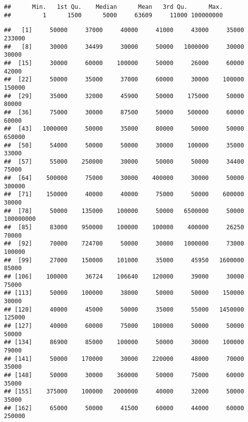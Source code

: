 \documentclass[
]{article}
\newenvironment{Shaded}{\begin{snugshade}}{\end{snugshade}}
\newcommand{\KeywordTok}[1]{\textcolor[rgb]{0.13,0.29,0.53}{\textbf{#1}}}
\newcommand{\NormalTok}[1]{#1}
\newcommand{\OperatorTok}[1]{\textcolor[rgb]{0.81,0.36,0.00}{\textbf{#1}}}
\begin{document}
\begin{verbatim}
##      Min.   1st Qu.    Median      Mean   3rd Qu.      Max. 
##         1      1500      5000     63609     11000 100000000
\end{verbatim}

\begin{Shaded}
\end{Shaded}

\begin{verbatim}
##   [1]     50000     37000     40000     41000     43000     35000    233000
##   [8]     30000     34499     30000     50000   1000000     30000     30000
##  [15]     30000     60000    100000     50000     26000     60000     42000
##  [22]     50000     35000     37000     60000     30000    100000    150000
##  [29]     35000     32000     45900     50000    175000     50000     80000
##  [36]     75000     30000     87500     50000    500000     60000     60000
##  [43]   1000000     50000     35000     80000     50000     50000    650000
##  [50]     54000     50000     50000     30000    100000     35000     33000
##  [57]     55000    250000     30000     50000     50000     34400     75000
##  [64]    500000     75000     30000    400000     30000     50000    300000
##  [71]    150000     40000     40000     75000     50000    600000     30000
##  [78]     50000    135000    100000     50000   6500000     50000 100000000
##  [85]     83000    950000    100000    100000    400000     26250     70000
##  [92]     70000    724700     50000     30000   1000000     73000    100000
##  [99]     27000    150000    101000     35000     45950   1600000     85000
## [106]    100000     36724    106640    120000     39000     30000     75000
## [113]     50000    100000     38000     50000     50000    150000     30000
## [120]     40000     45000     50000     35000     55000   1450000    125000
## [127]     40000     60000     75000    100000     50000     50000     50000
## [134]     86900     85000    100000     50000     30000    100000     79000
## [141]     50000    170000     30000    220000     48000     70000     35000
## [148]     50000     30000    360000     50000     75000     60000     35000
## [155]    375000    100000   2000000     40000     32000     50000     35000
## [162]     65000     50000     41500     60000     44000     60000    250000

\end{verbatim}
\end{document}
